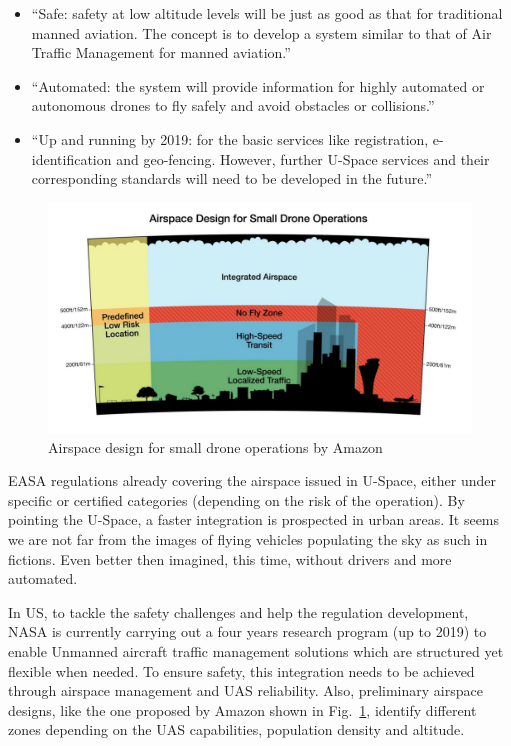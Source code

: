 \begin{itemize}
\item{``Safe: safety at low altitude levels will be just as good as that for traditional manned aviation. The concept is to develop a system similar to that of Air Traffic Management for manned aviation.''}
\item{``Automated: the system will provide information for highly automated or autonomous drones to fly safely and avoid obstacles or collisions.''}
\item{``Up and running by 2019: for the basic services like registration, e-identification and geo-fencing. However, further U-Space services and their corresponding standards will need to be developed in the future.''}
\end{itemize}


\begin{figure}
\begin{center}
\includegraphics[width=17cm]{figures/amazonDroneOperations}    %
\caption{Airspace design for small drone operations by Amazon \cite{amazonAirspace}} 
\label{fig:amazonDroneOperations}
\end{center}
\end{figure}

EASA regulations already covering the airspace issued in U-Space, either under specific or certified categories (depending on the risk of the operation). 
By pointing the U-Space, a faster integration is prospected in urban areas.
It seems we are not far from the images of flying vehicles populating the sky as such in fictions. 
Even better then imagined, this time, without drivers and more automated. 

In US, to tackle the safety challenges and help the regulation development, NASA is currently carrying out a four years research program (up to 2019) to enable Unmanned aircraft traffic management solutions which are structured yet flexible when needed. 
To ensure safety, this integration needs to be achieved through airspace management and UAS reliability.
Also, preliminary airspace designs, like the one proposed by Amazon shown in Fig.~\ref{fig:amazonDroneOperations}, identify different zones depending on the UAS capabilities, population density and altitude. 

